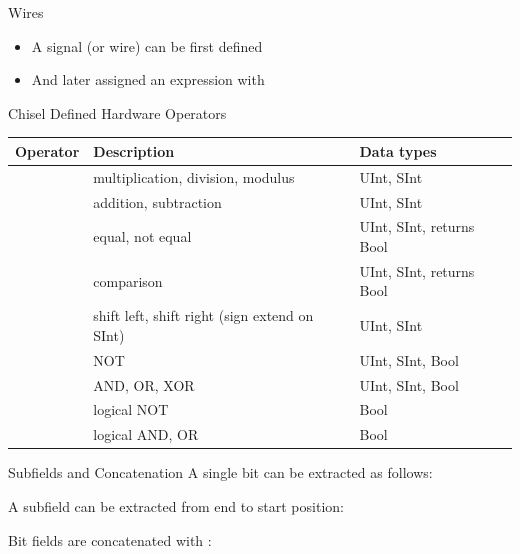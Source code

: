 \begin{frame}[fragile]{Wires}
\begin{itemize}
\item A signal (or wire) can be first defined
\item And later assigned an expression with \code{:=}
\end{itemize}
\end{frame}

\begin{frame}[fragile]{Chisel Defined Hardware Operators}
\begin{table}
{\footnotesize
  \begin{tabular}{lll}
    \toprule
    Operator & Description & Data types \\
    \midrule
    \code{* / \%} & multiplication, division, modulus & UInt, SInt \\
    \code{+ -} & addition, subtraction & UInt, SInt \\
    \code{=== =/=} & equal, not equal & UInt, SInt, returns Bool \\
    \code{> >= < <=} & comparison & UInt, SInt, returns Bool \\
    \code{<< >>} & shift left, shift right (sign extend on SInt) & UInt, SInt \\
    \code{\~} & NOT & UInt, SInt, Bool \\
    \code{\& | \^} & AND, OR, XOR & UInt, SInt, Bool \\
    \code{!} & logical NOT & Bool \\
    \code{\&\& ||} & logical AND, OR & Bool \\
    \bottomrule 
  \end{tabular} 
  }
\end{table}
\end{frame}

\begin{frame}[fragile]{Subfields and Concatenation}
A single bit can be extracted as follows:

\noindent A subfield can be extracted from end to start position:

\noindent Bit fields are concatenated with :
\end{frame}


